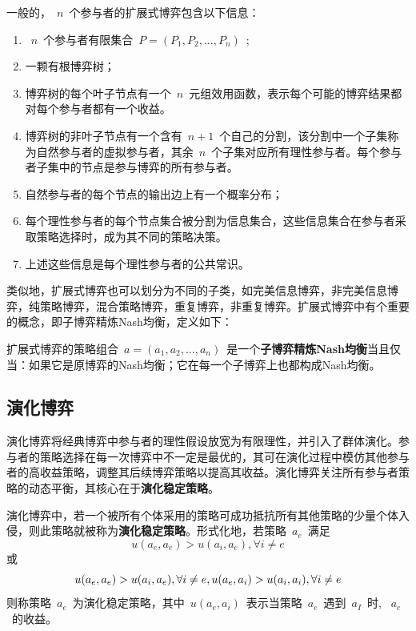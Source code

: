 \begin{definition}
一般的，~$n$~个参与者的扩展式博弈包含以下信息：
\begin{enumerate}
	\item ~$n$~个参与者有限集合~$P=(P_1,P_2,...,P_n)$~;
	\item 一颗有根博弈树；
	\item 博弈树的每个叶子节点有一个~$n$~元组效用函数，表示每个可能的博弈结果都对每个参与者都有一个收益。
	\item 博弈树的非叶子节点有一个含有~$n+1$~个自己的分割，该分割中一个子集称为自然参与者的虚拟参与者，其余~$n$~个子集对应所有理性参与者。每个参与者子集中的节点是参与博弈的所有参与者。
	
	\item 自然参与者的每个节点的输出边上有一个概率分布；
	\item 每个理性参与者的每个节点集合被分割为信息集合，这些信息集合在参与者采取策略选择时，成为其不同的策略决策。
	\item 上述这些信息是每个理性参与者的公共常识。
\end{enumerate}
\end{definition}

类似地，扩展式博弈也可以划分为不同的子类，如完美信息博弈，非完美信息博弈，纯策略博弈，混合策略博弈，重复博弈，非重复博弈。扩展式博弈中有个重要的概念，即子博弈精炼Nash均衡，定义如下：
\begin{definition}
扩展式博弈的策略组合~$a=(a_1,a_2,...,a_n)$~是一个\textbf{子博弈精炼Nash均衡}当且仅当：如果它是原博弈的Nash均衡；它在每一个子博弈上也都构成Nash均衡。
\end{definition}
\subsection{演化博弈}

演化博弈\cite{newton2018evolutionary,smith1982evolution}将经典博弈中参与者的理性假设放宽为有限理性，并引入了群体演化。参与者的策略选择在每一次博弈中不一定是最优的，其可在演化过程中模仿其他参与者的高收益策略，调整其后续博弈策略以提高其收益。演化博弈关注所有参与者策略的动态平衡，其核心在于\textbf{演化稳定策略}。

\begin{definition}
	演化博弈中，若一个被所有个体采用的策略可成功抵抗所有其他策略的少量个体入侵，则此策略就被称为\textbf{演化稳定策略}。形式化地，若策略~$a_e$~满足
	\begin{equation}
	u(a_e,a_e) > u(a_i,a_e), \forall i \ne e 
	\end{equation}
	或
	\begin{equation}
	u(a_e,a_e) > u(a_i,a_e), \forall i \ne e,\\
	u(a_e,a_i) > u(a_i,a_i), \forall i \ne e 
	\end{equation}
	则称策略~$a_e$~为演化稳定策略，其中~$u(a_e,a_i)$~表示当策略~$a_e$~遇到~$a_I$~时, ~$a_e$~的收益。
	
\end{definition}


